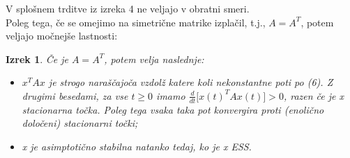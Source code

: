 \documentclass[a4paper]{article}
\newtheorem{theorem}{Izrek}
\begin{document}
V splošnem trditve iz izreka 4 ne veljajo v obratni smeri. \\
Poleg tega, če se omejimo na simetrične matrike izplačil, t.j., $A = A^T$, potem veljajo močnejše lastnosti:
\begin{theorem}
Če je $A = A^T$, potem velja naslednje:
\begin{itemize}
\item $x^T A x$ je strogo naraščajoča vzdolž katere koli nekonstantne poti po (6). Z drugimi besedami, za vse $t \geq 0$ imamo $\frac{d}{dt}\lbrack x(t)^T A x(t)\rbrack> 0$, razen če je x stacionarna točka. Poleg tega vsaka taka pot konvergira proti (enolično določeni) stacionarni točki;
\item x je asimptotično stabilna natanko tedaj, ko je x ESS.
\end{itemize}
\end{theorem}
\end{document}
